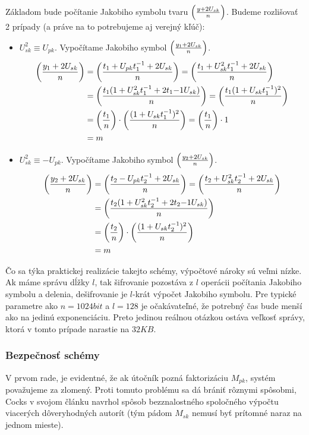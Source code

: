 Základom bude počítanie Jakobiho symbolu tvaru $\left( \frac{y +2 U_{sk}}{n} \right)$.
Budeme rozlišovať 2 prípady (a práve na to potrebujeme aj verejný kľúč):
\begin{itemize}
    \item $U_{sk}^2 \equiv U_{pk}$.
        Vypočítame Jakobiho symbol $\left( \frac{y_1 + 2U_{sk}}{n} \right)$.
        \begin{align*}
            \left( \frac{y_1 + 2U_{sk}}{n} \right) &=
            \left( \frac{t_1 + U_{pk} t_1^{-1} + 2 U_{sk}}{n} \right) =
            \left( \frac{t_1 + U_{sk}^2 t_1^{-1} + 2 U_{sk}}{n} \right) \\
            &=
            \left( \frac{t_1(1 + U_{sk}^2 t_1^{-1} + 2 t_1{-1} U_{sk})}{n} \right) =
            \left( \frac{t_1(1+U_{sk}t_1^{-1})^2}{n} \right)  \\
            &=
            \left( \frac{t_1}{n} \right) \cdot \left( \frac{(1+U_{sk}t_1^{-1})^2}{n} \right)=
            \left( \frac{t_1}{n} \right) \cdot 1 \\
            &= m
        \end{align*}

    \item $U_{sk}^2 \equiv -U_{pk}$.
        Vypočítame Jakobiho symbol $\left( \frac{y_2 + 2U_{sk}}{n} \right)$.
        \begin{align*}
            \left( \frac{y_2 + 2U_{sk}}{n} \right) &=
            \left( \frac{t_2 - U_{pk} t_2^{-1} + 2 U_{sk}}{n} \right) =
            \left( \frac{t_2 + U_{sk}^2 t_2^{-1} + 2 U_{sk}}{n} \right) \\
            &=
            \left( \frac{t_2(1 + U_{sk}^2 t_2^{-1} + 2 t_2{-1} U_{sk})}{n} \right)
            \\
            &=
            \left( \frac{t_2}{n} \right) \cdot \left( \frac{(1+U_{sk}t_2^{-1})^2}{n} \right) \\
            &= m
        \end{align*}
\end{itemize}

Čo sa týka praktickej realizácie takejto schémy, výpočtové nároky sú
veľmi nízke. Ak máme správu dĺžky $l$, tak
šifrovanie pozostáva z $l$ operácii počítania Jakobiho
symbolu a delenia, dešifrovanie je $l$-krát výpočet Jakobiho symbolu.
Pre typické parametre ako $n=1024bit$ a $l=128$ je očakávateľné, že
potrebný čas bude menší ako na jedinú exponenciáciu. Preto jedinou
reálnou otázkou ostáva veľkosť správy, ktorá v tomto prípade narastie
na $32KB$.

\subsubsection{Bezpečnosť schémy}
V prvom rade, je evidentné, že ak útočník pozná faktorizáciu $M_{pk}$,
systém považujeme za zlomený. Proti tomuto problému sa dá brániť
rôznymi spôsobmi, Cocks v svojom článku navrhol spôsob bezznalostného
spoločného výpočtu viacerých dôveryhodných autorít (tým pádom $M_{sk}$
nemusí byť prítomné naraz na jednom mieste).

